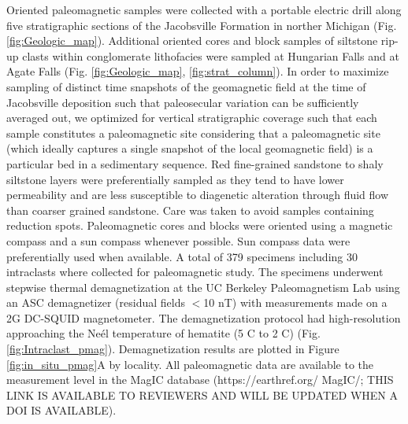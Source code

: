 \documentclass[draft]{agujournal2019}
\begin{document}
Oriented paleomagnetic samples were collected with a portable electric drill along five stratigraphic sections of the Jacobsville Formation in norther Michigan (Fig. \ref{fig:Geologic_map}). Additional oriented cores and block samples of siltstone rip-up clasts within conglomerate lithofacies were sampled at Hungarian Falls and at Agate Falls (Fig. \ref{fig:Geologic_map}, \ref{fig:strat_column}). In order to maximize sampling of distinct time snapshots of the geomagnetic field at the time of Jacobsville deposition such that paleosecular variation can be sufficiently averaged out, we optimized for vertical stratigraphic coverage such that each sample constitutes a paleomagnetic site considering that a paleomagnetic site (which ideally captures a single snapshot of the local geomagnetic field) is a particular bed in a sedimentary sequence. Red fine-grained sandstone to shaly siltstone layers were preferentially sampled as they tend to have lower permeability and are less susceptible to diagenetic alteration through fluid flow than coarser grained sandstone. Care was taken to avoid samples containing reduction spots. Paleomagnetic cores and blocks were oriented using a magnetic compass and a sun compass whenever possible. Sun compass data were preferentially used when available. A total of 379 specimens including 30 intraclasts where collected for paleomagnetic study. The specimens underwent stepwise thermal demagnetization at the UC Berkeley Paleomagnetism Lab using an ASC demagnetizer (residual fields $<$10 nT) with measurements made on a 2G DC-SQUID magnetometer. The demagnetization protocol had high-resolution approaching the Ne\'el temperature of hematite (5 \textdegree C to 2 \textdegree C) (Fig. \ref{fig:Intraclast_pmag}). Demagnetization results are plotted in Figure \ref{fig:in_situ_pmag}A by locality. All paleomagnetic data are available to the measurement level in the MagIC database (https://earthref.org/ MagIC/; THIS LINK IS AVAILABLE TO REVIEWERS AND WILL BE UPDATED WHEN A DOI IS AVAILABLE).
\end{document}
